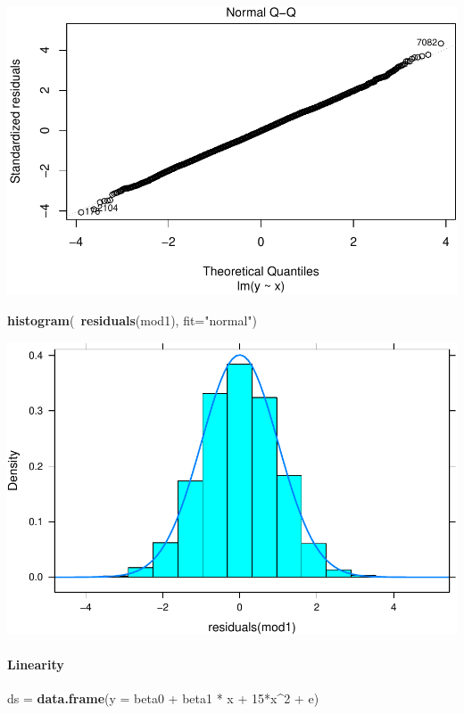 \documentclass[]{article}
\newenvironment{Shaded}{\begin{snugshade}}{\end{snugshade}}
\newcommand{\KeywordTok}[1]{\textcolor[rgb]{0.13,0.29,0.53}{\textbf{{#1}}}}
\newcommand{\DataTypeTok}[1]{\textcolor[rgb]{0.13,0.29,0.53}{{#1}}}
\newcommand{\DecValTok}[1]{\textcolor[rgb]{0.00,0.00,0.81}{{#1}}}
\newcommand{\StringTok}[1]{\textcolor[rgb]{0.31,0.60,0.02}{{#1}}}
\newcommand{\NormalTok}[1]{{#1}}
\let\oldparagraph\paragraph
\renewcommand{\paragraph}[1]{\oldparagraph{#1}\mbox{}}
\begin{document}
\includegraphics{02_lab_residuals_files/figure-latex/unnamed-chunk-11-3.pdf}

\begin{Shaded}
\begin{Highlighting}[]
\KeywordTok{histogram}\NormalTok{(~}\KeywordTok{residuals}\NormalTok{(mod1), }\DataTypeTok{fit=}\StringTok{"normal"}\NormalTok{)}
\end{Highlighting}
\end{Shaded}

\includegraphics{02_lab_residuals_files/figure-latex/unnamed-chunk-11-4.pdf}

\paragraph{Linearity}\label{linearity}

\begin{Shaded}
\begin{Highlighting}[]
\NormalTok{ds =}\StringTok{ }\KeywordTok{data.frame}\NormalTok{(}\DataTypeTok{y =} \NormalTok{beta0 +}\StringTok{ }\NormalTok{beta1 *}\StringTok{ }\NormalTok{x +}\StringTok{ }\DecValTok{15}\NormalTok{*x^}\DecValTok{2} \NormalTok{+}\StringTok{ }\NormalTok{e)}
\end{Highlighting}
\end{Shaded}
\end{document}
